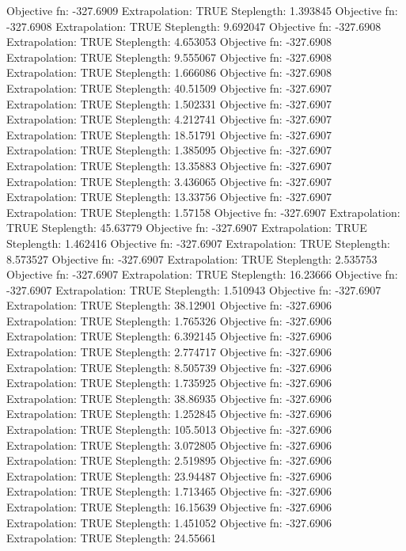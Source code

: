 \documentclass{article}
\begin{document}
\begin{Schunk}
\begin{Soutput}
Objective fn:  -327.6909   Extrapolation:  TRUE   Steplength:  1.393845 
Objective fn:  -327.6908   Extrapolation:  TRUE   Steplength:  9.692047 
Objective fn:  -327.6908   Extrapolation:  TRUE   Steplength:  4.653053 
Objective fn:  -327.6908   Extrapolation:  TRUE   Steplength:  9.555067 
Objective fn:  -327.6908   Extrapolation:  TRUE   Steplength:  1.666086 
Objective fn:  -327.6908   Extrapolation:  TRUE   Steplength:  40.51509 
Objective fn:  -327.6907   Extrapolation:  TRUE   Steplength:  1.502331 
Objective fn:  -327.6907   Extrapolation:  TRUE   Steplength:  4.212741 
Objective fn:  -327.6907   Extrapolation:  TRUE   Steplength:  18.51791 
Objective fn:  -327.6907   Extrapolation:  TRUE   Steplength:  1.385095 
Objective fn:  -327.6907   Extrapolation:  TRUE   Steplength:  13.35883 
Objective fn:  -327.6907   Extrapolation:  TRUE   Steplength:  3.436065 
Objective fn:  -327.6907   Extrapolation:  TRUE   Steplength:  13.33756 
Objective fn:  -327.6907   Extrapolation:  TRUE   Steplength:  1.57158 
Objective fn:  -327.6907   Extrapolation:  TRUE   Steplength:  45.63779 
Objective fn:  -327.6907   Extrapolation:  TRUE   Steplength:  1.462416 
Objective fn:  -327.6907   Extrapolation:  TRUE   Steplength:  8.573527 
Objective fn:  -327.6907   Extrapolation:  TRUE   Steplength:  2.535753 
Objective fn:  -327.6907   Extrapolation:  TRUE   Steplength:  16.23666 
Objective fn:  -327.6907   Extrapolation:  TRUE   Steplength:  1.510943 
Objective fn:  -327.6907   Extrapolation:  TRUE   Steplength:  38.12901 
Objective fn:  -327.6906   Extrapolation:  TRUE   Steplength:  1.765326 
Objective fn:  -327.6906   Extrapolation:  TRUE   Steplength:  6.392145 
Objective fn:  -327.6906   Extrapolation:  TRUE   Steplength:  2.774717 
Objective fn:  -327.6906   Extrapolation:  TRUE   Steplength:  8.505739 
Objective fn:  -327.6906   Extrapolation:  TRUE   Steplength:  1.735925 
Objective fn:  -327.6906   Extrapolation:  TRUE   Steplength:  38.86935 
Objective fn:  -327.6906   Extrapolation:  TRUE   Steplength:  1.252845 
Objective fn:  -327.6906   Extrapolation:  TRUE   Steplength:  105.5013 
Objective fn:  -327.6906   Extrapolation:  TRUE   Steplength:  3.072805 
Objective fn:  -327.6906   Extrapolation:  TRUE   Steplength:  2.519895 
Objective fn:  -327.6906   Extrapolation:  TRUE   Steplength:  23.94487 
Objective fn:  -327.6906   Extrapolation:  TRUE   Steplength:  1.713465 
Objective fn:  -327.6906   Extrapolation:  TRUE   Steplength:  16.15639 
Objective fn:  -327.6906   Extrapolation:  TRUE   Steplength:  1.451052 
Objective fn:  -327.6906   Extrapolation:  TRUE   Steplength:  24.55661 

\end{Soutput}
\end{Schunk}
\end{document}

